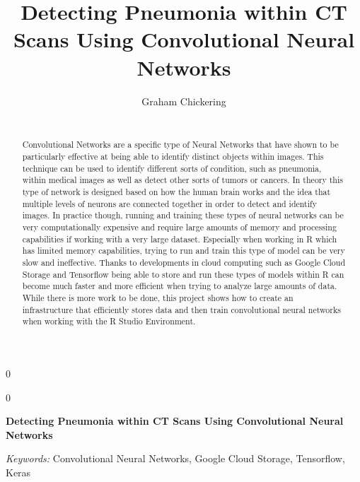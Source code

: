 \documentclass[12pt]{article}
\newcommand{\blind}{0}
\begin{document}
\def\spacingset#1{\renewcommand{\baselinestretch}%
{#1}\small\normalsize} \spacingset{1}



\blind
{
  \title{\bf Detecting Pneumonia within CT Scans Using Convolutional Neural Networks}

  \author{
        Graham Chickering \\
    \\
      }
  \maketitle
} \fi

\blind
{
  \bigskip
  \bigskip
  \bigskip
  \begin{center}
    {\LARGE\bf Detecting Pneumonia within CT Scans Using Convolutional Neural Networks}
  \end{center}
  \medskip
} \fi

\bigskip
\begin{abstract}
Convolutional Networks are a specific type of Neural Networks that have
shown to be particularly effective at being able to identify distinct
objects within images. This technique can be used to identify different
sorts of condition, such as pneumonia, within medical images as well as
detect other sorts of tumors or cancers. In theory this type of network
is designed based on how the human brain works and the idea that
multiple levels of neurons are connected together in order to detect and
identify images. In practice though, running and training these types of
neural networks can be very computationally expensive and require large
amounts of memory and processing capabilities if working with a very
large dataset. Especially when working in R which has limited memory
capabilities, trying to run and train this type of model can be very
slow and ineffective. Thanks to developments in cloud computing such as
Google Cloud Storage and Tensorflow being able to store and run these
types of models within R can become much faster and more efficient when
trying to analyze large amounts of data. While there is more work to be
done, this project shows how to create an infrastructure that
efficiently stores data and then train convolutional neural networks
when working with the R Studio Environment.
\end{abstract}

\noindent%
{\it Keywords:} Convolutional Neural Networks, Google Cloud Storage, Tensorflow, Keras
\vfill
\end{document}
